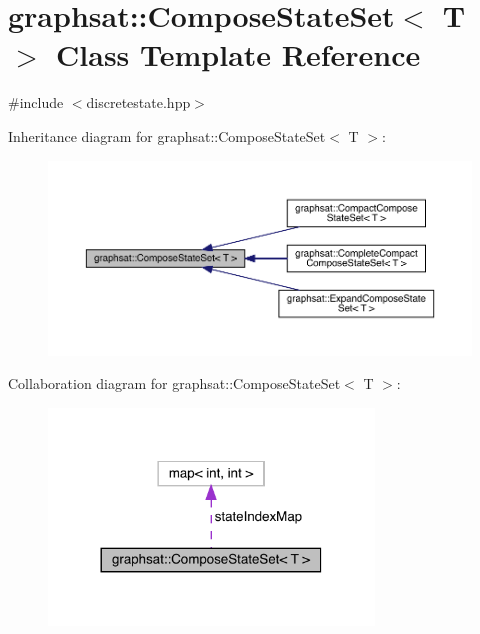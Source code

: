 \hypertarget{classgraphsat_1_1_compose_state_set}{}\section{graphsat\+::Compose\+State\+Set$<$ T $>$ Class Template Reference}
\label{classgraphsat_1_1_compose_state_set}


{\ttfamily \#include $<$discretestate.\+hpp$>$}



Inheritance diagram for graphsat\+::Compose\+State\+Set$<$ T $>$\+:\nopagebreak
\begin{figure}[H]
\begin{center}
\leavevmode
\includegraphics[width=350pt]{classgraphsat_1_1_compose_state_set__inherit__graph}
\end{center}
\end{figure}


Collaboration diagram for graphsat\+::Compose\+State\+Set$<$ T $>$\+:\nopagebreak
\begin{figure}[H]
\begin{center}
\leavevmode
\includegraphics[width=245pt]{classgraphsat_1_1_compose_state_set__coll__graph}
\end{center}
\end{figure}
